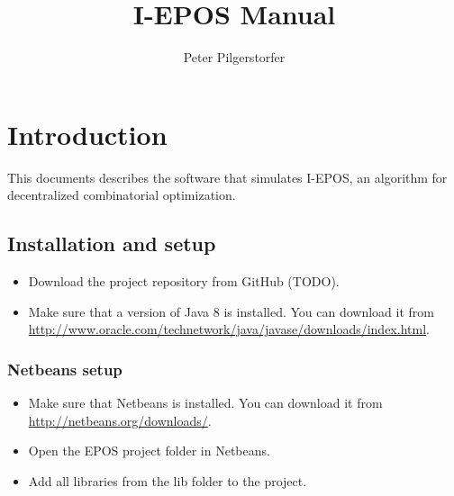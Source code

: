 \documentclass[11pt]{article} %
\title{I-EPOS Manual}
\author{Peter Pilgerstorfer}
\begin{document}
\maketitle

\section{Introduction}
This documents describes the software that simulates I-EPOS, an algorithm for decentralized combinatorial optimization.

\subsection{Installation and setup}
\begin{itemize}
	\item Download the project repository from GitHub (TODO).
	\item Make sure that a version of Java 8 is installed. You can download it from \url{http://www.oracle.com/technetwork/java/javase/downloads/index.html}.
\end{itemize}
\subsubsection*{Netbeans setup}
\begin{itemize}
	\item Make sure that Netbeans is installed. You can download it from \url{http://netbeans.org/downloads/}.
	\item Open the EPOS project folder in Netbeans.
	\item Add all libraries from the lib folder to the project.
\end{itemize}
\end{document}
